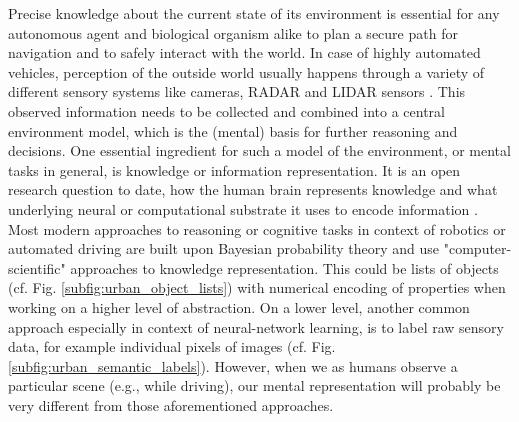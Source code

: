 Precise knowledge about the current state of its environment is essential for any autonomous agent and biological organism alike to plan a secure path for navigation and to safely interact with the world.
In case of highly automated vehicles, perception of the outside world usually happens through a variety of different sensory systems like cameras, \acs{RADAR} and \acs{LIDAR} sensors \cite{Aeberhard2015}.
This observed information needs to be collected and combined into a central environment model, which is the (mental) basis for further reasoning and decisions.
One essential ingredient for such a model of the environment, or mental tasks in general, is knowledge or information representation.
It is an open research question to date, how the human brain represents knowledge and what underlying neural or computational substrate it uses to encode information \cite{Wang2003, Samsonovich2012, Handjaras2016}.
Most modern approaches to reasoning or cognitive tasks in context of robotics or automated driving are built upon Bayesian probability theory and use "computer-scientific" approaches to knowledge representation.
This could be lists of objects (cf. Fig. \ref{subfig:urban_object_lists}) with numerical encoding of properties when working on a higher level of abstraction.
On a lower level, another common approach especially in context of neural-network learning, is to label raw sensory data, for example individual pixels of images (cf. Fig. \ref{subfig:urban_semantic_labels}).
However, when we as humans observe a particular scene (e.g., while driving), our mental representation will probably be very different from those aforementioned approaches.
